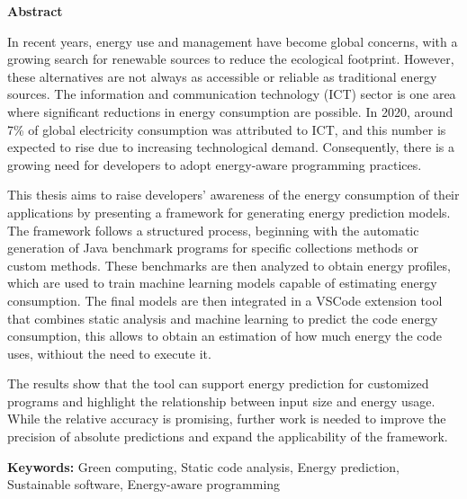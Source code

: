 \vspace*{2cm}
\begin{center}
\Large \bf Abstract
\end{center}
\vspace*{1cm} \setlength{\baselineskip}{0.6cm}

In recent years, energy use and management have become global concerns, with a growing search for renewable sources to reduce the ecological footprint. However, these alternatives are not always as accessible or reliable as traditional energy sources. The information and communication technology (ICT) sector is one area where significant reductions in energy consumption are possible. In 2020, around 7\% of global electricity consumption was attributed to ICT, and this number is expected to rise due to increasing technological demand. Consequently, there is a growing need for developers to adopt energy-aware programming practices.

This thesis aims to raise developers’ awareness of the energy consumption of their applications by presenting a framework for generating energy prediction models. The framework follows a structured process, beginning with the automatic generation of Java benchmark programs for specific collections methods or custom methods. These benchmarks are then analyzed to obtain energy profiles, which are used to train machine learning models capable of estimating energy consumption. The final models are then integrated in a VSCode extension tool that combines static analysis and machine learning to predict the code energy consumption, this allows to obtain an estimation of how much energy the code uses, withiout the need to execute it.

The results show that the tool can support energy prediction for customized programs and highlight the relationship between input size and energy usage. While the relative accuracy is promising, further work is needed to improve the precision of absolute predictions and expand the applicability of the framework.



\vfill

\begin{flushleft}
\textbf{Keywords:}
Green computing, Static code analysis, Energy prediction, Sustainable software, Energy-aware programming
\end{flushleft}

{}
